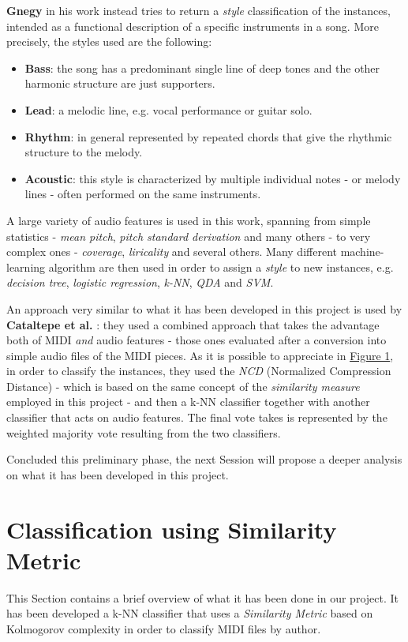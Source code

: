 \documentclass[a4paper]{article}
\begin{document}
	\textbf{Gnegy} in his work \cite{chet} instead tries to return a \textit{style} classification of the instances, intended as a functional description of a specific instruments in a song. More precisely, the styles used are the following: 
	\begin{itemize}
		\item \textbf{Bass}: the song has a predominant single line of deep tones and the other harmonic structure are just supporters.
		\item \textbf{Lead}: a melodic line, e.g. vocal performance or guitar solo.
		\item \textbf{Rhythm}: in general represented by repeated chords that give the rhythmic structure to the melody.
		\item \textbf{Acoustic}: this style is characterized by multiple individual notes - or melody lines - often performed on the same instruments.
	\end{itemize}
	A large variety of audio features is used in this work, spanning from simple statistics - \textit{mean pitch}, \textit{pitch standard derivation} and many others - to very complex ones - \textit{coverage}, \textit{liricality} and several others. Many different machine-learning algorithm are then used in order to assign a \textit{style} to new instances, e.g. \textit{decision tree}, \textit{logistic regression}, \textit{k-NN}, \textit{QDA} and \textit{SVM}.
	
	An approach very similar to what it has been developed in this project is used by \textbf{Cataltepe et al.} \cite{catelape}: they used a combined approach that takes the advantage both of MIDI \textit{and} audio features - those ones evaluated after a conversion into simple audio files of the MIDI pieces. As it is possible to appreciate in \hyperref[fig:audio_and_NCD]{Figure 1}, in order to classify the instances, they used the \textit{NCD}  (Normalized Compression Distance) - which is based on the same concept of the \textit{similarity measure} employed in this project - and then a k-NN classifier together with another classifier that acts on audio features. The final vote takes is represented by the weighted majority vote resulting from the two classifiers.
	
	Concluded this preliminary phase, the next Session will propose a deeper analysis on what it has been developed in this project.
	
	
	\section{Classification using Similarity Metric}
	\lettrine[nindent=0em,lines=2]{T}{}his Section contains a brief overview of what it has been done in our project. It has been developed a k-NN classifier that uses a  \textit{Similarity Metric} based on Kolmogorov complexity in order to classify MIDI files by author. 
	
\end{document}
